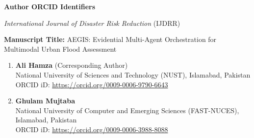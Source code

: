 \documentclass[11pt,a4paper]{article}
\begin{document}
\thispagestyle{empty}

\begin{center}
{\Large \bf Author ORCID Identifiers \par}
\vspace{0.5em}
{\large \textit{International Journal of Disaster Risk Reduction} (IJDRR) \par}
\end{center}

\vspace{2em}

\noindent \textbf{Manuscript Title:} AEGIS: Evidential Multi-Agent Orchestration for Multimodal Urban Flood Assessment

\vspace{2em}

\begin{enumerate}[leftmargin=*,itemsep=1.5em]
    \item \textbf{Ali Hamza} (Corresponding Author) \\
    National University of Sciences and Technology (NUST), Islamabad, Pakistan \\
    ORCID iD: \href{https://orcid.org/0009-0006-9790-6643}{https://orcid.org/0009-0006-9790-6643}

    \item \textbf{Ghulam Mujtaba} \\
    National University of Computer and Emerging Sciences (FAST-NUCES), Islamabad, Pakistan \\
    ORCID iD: \href{https://orcid.org/0009-0006-3988-8088}{https://orcid.org/0009-0006-3988-8088}
\end{enumerate}
\end{document}
